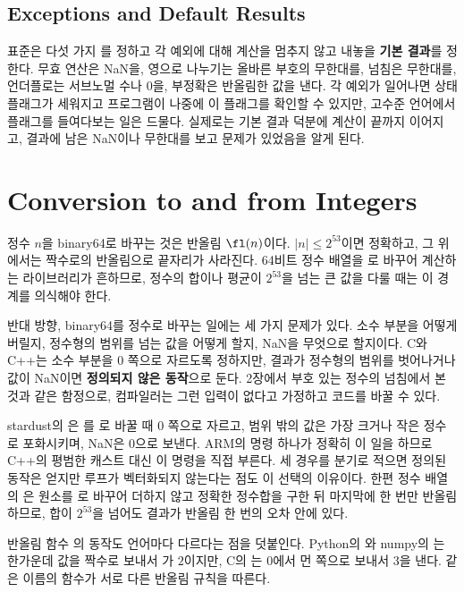 \subsection{Exceptions and Default Results}

표준은 다섯 가지 를 정하고 각 예외에 대해 계산을 멈추지 않고 내놓을 \textbf{기본 결과}를 정한다. 무효 연산은 NaN을, 영으로 나누기는 올바른 부호의 무한대를, 넘침은 무한대를, 언더플로는 서브노멀 수나 $0$을, 부정확은 반올림한 값을 낸다. 각 예외가 일어나면 상태 플래그가 세워지고 프로그램이 나중에 이 플래그를 확인할 수 있지만, 고수준 언어에서 플래그를 들여다보는 일은 드물다. 실제로는 기본 결과 덕분에 계산이 끝까지 이어지고, 결과에 남은 NaN이나 무한대를 보고 문제가 있었음을 알게 된다.

\section{Conversion to and from Integers}
\label{sec:conversion}

정수 $n$을 binary64로 바꾸는 것은 반올림 $\fl(n)$이다. $|n|\le2^{53}$이면 정확하고, 그 위에서는 짝수로의 반올림으로 끝자리가 사라진다. 64비트 정수 배열을 로 바꾸어 계산하는 라이브러리가 흔하므로, 정수의 합이나 평균이 $2^{53}$을 넘는 큰 값을 다룰 때는 이 경계를 의식해야 한다.

반대 방향, binary64를 정수로 바꾸는 일에는 세 가지 문제가 있다. 소수 부분을 어떻게 버릴지, 정수형의 범위를 넘는 값을 어떻게 할지, NaN을 무엇으로 할지이다. C와 C++는 소수 부분을 $0$ 쪽으로 자르도록 정하지만, 결과가 정수형의 범위를 벗어나거나 값이 NaN이면 \textbf{정의되지 않은 동작}으로 둔다\cite{iso14882-2020}. 2장에서 부호 있는 정수의 넘침에서 본 것과 같은 함정으로, 컴파일러는 그런 입력이 없다고 가정하고 코드를 바꿀 수 있다.

\begin{instardust}
stardust의 은 를 로 바꿀 때 $0$ 쪽으로 자르고, 범위 밖의 값은 가장 크거나 작은 정수로 포화시키며, NaN은 $0$으로 보낸다. ARM의  명령 하나가 정확히 이 일을 하므로 C++의 평범한 캐스트 대신 이 명령을 직접 부른다. 세 경우를 분기로 적으면 정의된 동작은 얻지만 루프가 벡터화되지 않는다는 점도 이 선택의 이유이다. 한편 정수 배열의 은 원소를 로 바꾸어 더하지 않고 정확한 정수합을 구한 뒤 마지막에 한 번만 반올림하므로, 합이 $2^{53}$을 넘어도 결과가 반올림 한 번의 오차 안에 있다.
\end{instardust}

반올림 함수 의 동작도 언어마다 다르다는 점을 덧붙인다. Python의 와 numpy의 는 한가운데 값을 짝수로 보내서 가 $2$이지만, C의 는 $0$에서 먼 쪽으로 보내서 $3$을 낸다. 같은 이름의 함수가 서로 다른 반올림 규칙을 따른다.

